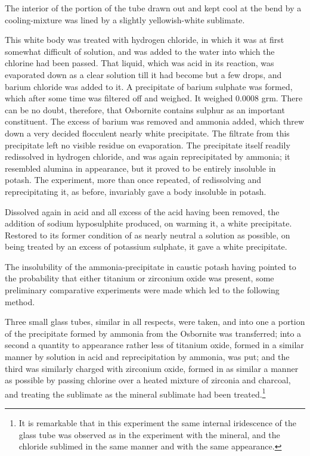 \documentclass[a4paper, 12pt, oneside]{article}
\begin{document}
The interior of the portion of the tube drawn out and kept cool at the bend by a cooling-mixture was lined by a slightly yellowish-white sublimate.

This white body was treated with hydrogen chloride, in which it was at first somewhat difficult of solution, and was added to the water into which the chlorine had been passed. That liquid, which was acid in its reaction, was evaporated down as a clear solution till it had become but a few drops, and barium chloride was added to it. A precipitate of barium sulphate was formed, which after some time was filtered off and weighed. It weighed 0.0008 grm. There can be no doubt, therefore, that Osbornite contains sulphur as an important constituent. The excess of barium was removed and ammonia added, which threw down a very decided flocculent nearly white precipitate. The filtrate from this precipitate left no visible residue on evaporation. The precipitate itself readily redissolved in hydrogen chloride, and was again reprecipitated by ammonia; it resembled alumina in appearance, but it proved to be entirely insoluble in potash. The experiment, more than once repeated, of redissolving and reprecipitating it, as before, invariably gave a body insoluble in potash.

Dissolved again in acid and all excess of the acid having been removed, the addition of sodium hyposulphite produced, on warming it, a white precipitate. Restored to its former condition of as nearly neutral a solution as possible, on being treated by an excess of potassium sulphate, it gave a white precipitate.

The insolubility of the ammonia-precipitate in caustic potash having pointed to the probability that either titanium or zirconium oxide was present, some preliminary comparative experiments were made which led to the following method.

Three small glass tubes, similar in all respects, were taken, and into one a portion of the precipitate formed by ammonia from the Osbornite was transferred; into a second a quantity to appearance rather less of titanium oxide, formed in a similar manner by solution in acid and reprecipitation by ammonia, was put; and the third was similarly charged with zirconium oxide, formed in as similar a manner as possible by passing chlorine over a heated mixture of zirconia and charcoal, and treating the sublimate as the mineral sublimate had been treated.\footnote{It is remarkable that in this experiment the same internal iridescence of the glass tube was observed as in the experiment with the mineral, and the chloride sublimed in the same manner and with the same appearance.}
\end{document}
